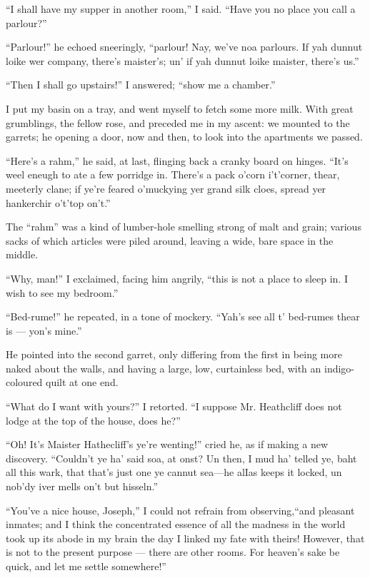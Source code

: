 \par “I shall have my supper in another room,” I said. “Have you no place you call a parlour?”
\par “Parlour!” he echoed sneeringly, “parlour! Nay, we've noa parlours. If yah dunnut loike wer company, there's maister's; un' if yah dunnut loike maister, there's us.”
\par “Then I shall go upstairs!” I answered; “show me a chamber.”
\par I put my basin on a tray, and went myself to fetch some more milk. With great grumblings, the fellow rose, and preceded me in my ascent: we mounted to the garrets; he opening a door, now and then, to look into the apartments we passed.
\par “Here's a rahm,” he said, at last, flinging back a cranky board on hinges. “It's weel eneugh to ate a few porridge in. There's a pack o'corn i't'corner, thear, meeterly clane; if ye're feared o'muckying yer grand silk cloes, spread yer hankerchir o't'top on't.”
\par The “rahm” was a kind of lumber-hole smelling strong of malt and grain; various sacks of which articles were piled around, leaving a wide, bare space in the middle.
\par “Why, man!” I exclaimed, facing him angrily, “this is not a place to sleep in. I wish to see my bedroom.”
\par “Bed-rume!” he repeated, in a tone of mockery. “Yah's see all t' bed-rumes thear is — yon's mine.”
\par He pointed into the second garret, only differing from the first in being more naked about the walls, and having a large, low, curtainless bed, with an indigo-coloured quilt at one end.
\par “What do I want with yours?” I retorted. “I suppose Mr. Heathcliff does not lodge at the top of the house, does he?”
\par “Oh! It's Maister Hathecliff's ye're wenting!” cried he, as if making a new discovery. “Couldn't ye ha' said soa, at onst? Un then, I mud ha' telled ye, baht all this wark, that that's just one ye cannut sea—he alIas keeps it locked, un nob'dy iver mells on't but hisseln.”
\par “You've a nice house, Joseph,” I could not refrain from observing,“and pleasant inmates; and I think the concentrated essence of all the madness in the world took up its abode in my brain the day I linked my fate with theirs! However, that is not to the present purpose — there are other rooms. For heaven's sake be quick, and let me settle somewhere!”
